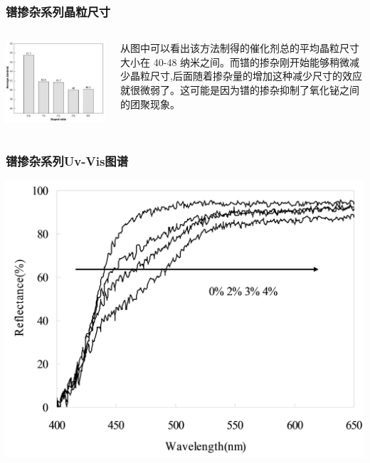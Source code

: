 \documentclass[xetex,compress]{mybeamer}
\begin{document}
\begin{frame}
\frametitle{镨掺杂系列晶粒尺寸}
\begin{columns}
\begin{block}{}
\centering
\includegraphics[width=\linewidth]{figures/镨掺杂粒径大小.jpg} 
\end{block}
\begin{block}{}
从图中可以看出该方法制得的催化剂总的平均晶粒尺寸大小在 40-48 纳米之间。而镨的掺杂刚开始能够稍微减少晶粒尺寸,后面随着掺杂量的增加这种减少尺寸的效应就很微弱了。这可能是因为镨的掺杂抑制了氧化铋之间的团聚现象。
\end{block}
\end{columns}
\end{frame}


\begin{frame}
\frametitle{镨掺杂系列Uv-Vis图谱}
\begin{block}{}
\centering
\includegraphics[width=0.8\linewidth]{figures/镨掺杂UV.jpg} 
\end{block}
\end{frame}
\end{document}
